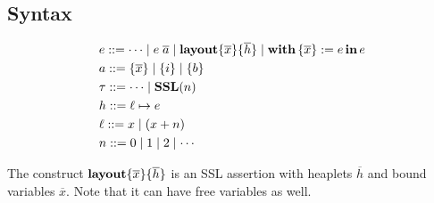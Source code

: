 \subsection{\PikaCore{} Syntax}
\begin{align*}
  &e ::= \cdots \mid e\; \overline{a} \mid \textbf{layout}\{ \overline{x} \}\{ \overline{h} \} \mid \textbf{with}\,\{ \overline{x} \} := e\,\textbf{in}\, e
  \\
  &a ::= \{ \overline{x} \} \mid \{ i \} \mid \{ b \}
  \\
  &\tau ::= \cdots \mid \textbf{SSL}(n)
  \\
  &h ::= \ell \mapsto e
  \\
  &\ell ::= x \mid (x + n)
  \\
  &n ::= 0 \mid 1 \mid 2 \mid \cdots
\end{align*}

The construct $\textbf{layout}\{ \overline{x} \}\{ \overline{h} \}$ is an SSL assertion with heaplets $\overline{h}$ and
bound variables $\overline{x}$. Note that it can have free variables as well.

%
%
%
%
%
